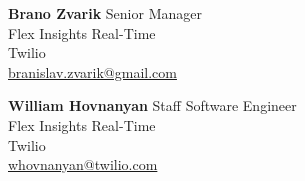 \item \textbf{Brano Zvarik} \hfill {Senior Manager}\\
    Flex Insights Real-Time\\
    Twilio\\
    \faEnvelope \hspace{0.5mm}
    \href{mailto:branislav.zvarik@gmail.com}{branislav.zvarik@gmail.com}

\item \textbf{William Hovnanyan} \hfill {Staff Software Engineer}\\
    Flex Insights Real-Time\\
    Twilio\\
    \faEnvelope \hspace{0.5mm} \href{mailto:whovnanyan@twilio.com}{whovnanyan@twilio.com}